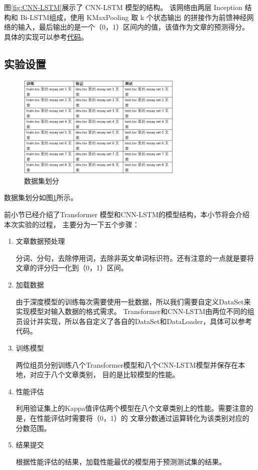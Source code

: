 \documentclass[UTF8]{article}
\begin{document}
图\ref{fig:CNN-LSTM}展示了 CNN-LSTM 模型的结构。
该网络由两层 Inception 结构和 Bi-LSTM组成，使用 KMaxPooling 取 k 个状态输出
的拼接作为前馈神经网络的输入，最后输出的是一个（0，1）区间内的值，该值作为文章的预测得分。
具体的实现可以参考\href{https://github.com/Mandule/EssayAE/tree/master/HW2}{代码}。

\subsection{实验设置}

\begin{figure}[h]
    \centering
    \includegraphics[width=0.7\textwidth]{fig/11.png}
    \caption{数据集划分}
    \label{fig:HW2}
\end{figure}

数据集划分如图\ref{fig:HW2}所示。

前小节已经介绍了Transformer 模型和CNN-LSTM的模型结构，本小节将会介绍本次实验的过程，
主要分为一下五个步骤：
\begin{enumerate}
    \item 文章数据预处理

    分词、分句，去除停用词，去除非英文单词标识符。还有注意的一点就是要将文章的评分归一化到（0，1）区间。
    \item 加载数据
    
    由于深度模型的训练每次需要使用一批数据，所以我们需要自定义DataSet来实现模型对输入数据的格式需求。
    Transformer和CNN-LSTM由两位不同的组员设计并实现，所以各自定义了各自的DataSet和DataLoader，具体可以参考代码。
    \item 训练模型
    
    两位组员分别训练八个Transformer模型和八个CNN-LSTM模型并保存在本地，对应于八个文章类别，
    目的是比较模型的性能。
    \item 性能评估
    
    利用验证集上的Kappa值评估两个模型在八个文章类别上的性能。需要注意的是，在性能评估时需要将（0，1）的
    文章分数通过运算转化为该类别对应的分数范围。
    \item 结果提交
    
    根据性能评估的结果，加载性能最优的模型用于预测测试集的结果。
\end{enumerate}
\end{document}

